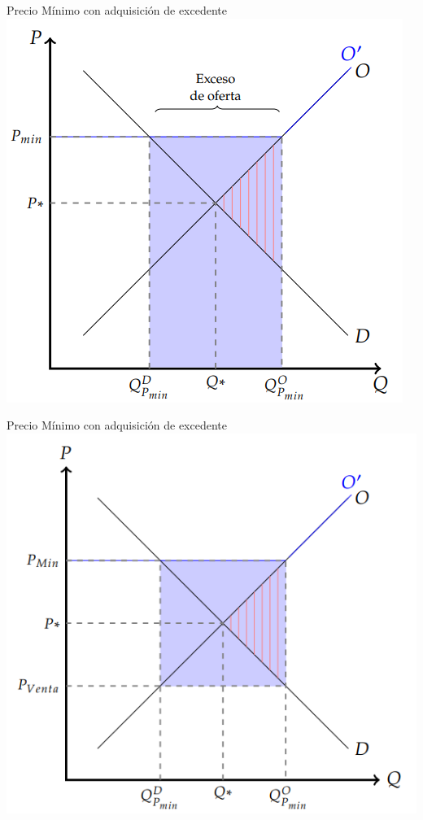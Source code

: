 \documentclass{beamer}
\begin{document}
\begin{frame}{Precio Mínimo con adquisición de excedente}
    \centering
    \includegraphics[scale=0.7]{../Figures/C24.8.png}
\end{frame}

\begin{frame}{Precio Mínimo con adquisición de excedente}
    \centering
    \includegraphics[scale=0.7]{../Figures/C24.9.png}
\end{frame}
\end{document}
